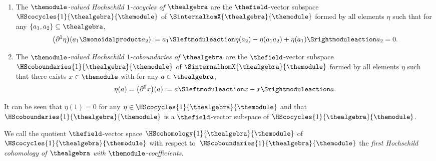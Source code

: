 \documentclass[pdftex]{sigma}
\numberwithin{equation}{section}
\begin{document}
{\begin{Definition}
  \label{definition:hochschild-one-cocycles-and-coboundaries} \
  \begin{enumerate}\itemsep=0pt
  \item
    \label{definition:hochschild-one-cocycles-and-coboundaries-1}
    {
      \newcommand{\someonecocycle}{\eta}
      \newcommand{\firstelement}{a_1}
      \newcommand{\secondelement}{a_2}
      The \emph{$\themodule$-valued Hochschild $1$-cocycles of $\thealgebra$} are the $\thefield$-vector subspace $\HScocycles{1}{\thealgebra}{\themodule}$ of $\SinternalhomX{\thealgebra}{\themodule}$ formed by  all elements $\someonecocycle$ such that    for any $\{\firstelement,\secondelement\}\subseteq \thealgebra$,
    \[
      \bigl(\partial^1\someonecocycle\bigr)(\firstelement\Smonoidalproduct\secondelement):= \firstelement\Sleftmoduleaction\someonecocycle(\secondelement)-\someonecocycle(\firstelement\secondelement)+\someonecocycle(\firstelement)\Srightmoduleaction\secondelement=0.
    \]
  }
\item
  \label{definition:hochschild-one-cocycles-and-coboundaries-2}
  {
    \newcommand{\someonecocycle}{\eta}
    \newcommand{\somevector}{x}
     \newcommand{\someelement}{a}
     The \emph{$\themodule$-valued Hochschild $1$-coboundaries of $\thealgebra$} are the $\thefield$-vector subspace $\HScoboundaries{1}{\thealgebra}{\themodule}$ of $\SinternalhomX{\thealgebra}{\themodule}$ formed by  all elements $\someonecocycle$ such that there exists $\somevector\in\themodule$ with     for any $\someelement\in\thealgebra$,
     \[
       \someonecocycle(\someelement)=\bigl(\partial^0 \somevector\bigr)(\someelement):= \someelement\Sleftmoduleaction\somevector -\somevector\Srightmoduleaction\someelement.
     \]
   }
  \end{enumerate}
\end{Definition}
{
  \newcommand{\somecocycle}{\eta}
It can be seen that $\somecocycle(1)=0$ for any $\somecocycle\in\HScocycles{1}{\thealgebra}{\themodule}$ and that $\HScoboundaries{1}{\thealgebra}{\themodule}$ is a $\thefield$-vector sub\-space of $\HScocycles{1}{\thealgebra}{\themodule}$.
}

\begin{Definition}
  \label{definition:hochschild-one-cohomology}
We call the quotient $\thefield$-vector space $\HScohomology{1}{\thealgebra}{\themodule}$ of   $\HScocycles{1}{\thealgebra}{\themodule}$ with respect to~$\HScoboundaries{1}{\thealgebra}{\themodule}$ the \emph{first Hochschild cohomology of  $\thealgebra$ with  $\themodule$-coefficients}.
\end{Definition}

}
\end{document}
